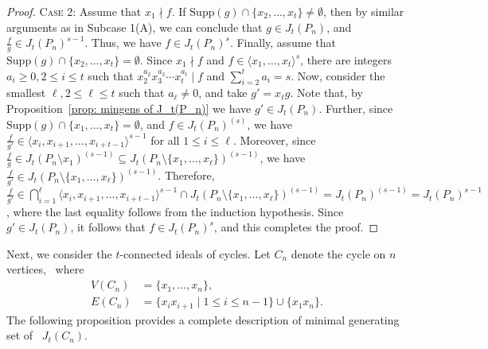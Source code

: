 \documentclass[12pt]{amsart}
\def\l{\langle}
\def\r{\rangle}
\begin{document}
\begin{proof}
	\medskip
	\noindent
	\textsc{Case 2}: Assume that $x_1\nmid f$. If $\mathrm{Supp}(g)\cap \{x_2,\ldots ,x_t\}\neq \emptyset$, then by similar arguments as in Subcase 1(A), we can conclude that $g\in J_t(P_n)$, and $\frac{f}{g}\in J_t(P_n)^{s-1}$. Thus, we have $f\in J_t(P_n)^{s}$. Finally, assume that $\mathrm{Supp}(g)\cap \{x_2,\dots ,x_t\}= \emptyset$. Since $x_1\nmid f$ and $f\in \l x_1,\dots ,x_t\r^s$, there are integers $a_i\geq 0, 2\leq i\leq t$ such that $x_2^{a_2}x_3^{a_3}\cdots x_{t}^{a_t}\mid f$ and $\sum_{i=2}^ta_i=s$. Now, consider the smallest $\ell, 2\leq \ell \leq t$ such that $a_{\ell}\neq 0$, and take $g'=x_{\ell}g$. Note that, by Proposition~\ref{prop: mingens of J_t(P_n)} we have $g'\in J_t(P_n)$. Further, since $\mathrm{Supp}(g)\cap \{x_1,\dots ,x_t\}= \emptyset$, and $f\in J_t(P_n)^{(s)}$, we have $\frac{f}{g'}\in \l x_i, x_{i+1},\dots , x_{i+t-1}\r^{s-1}$ for all $1\leq i\leq \ell$. Moreover, since $\frac{f}{g}\in J_t(P_n\setminus x_1)^{(s-1)}\subseteq J_t(P_n\setminus \{x_1,\dots , x_{\ell}\})^{(s-1)}$, we have $\frac{f}{g'}\in J_t(P_n\setminus \{x_1,\dots , x_{\ell}\})^{(s-1)}$. Therefore, $\frac{f}{g'}\in \bigcap_{i=1}^{\ell} \l x_i, x_{i+1},\dots , x_{i+t-1}\r^{s-1} \cap J_t(P_n\setminus \{x_1,\dots , x_{\ell}\})^{(s-1)}= J_t(P_n)^{(s-1)}= J_t(P_n)^{s-1}$, where the last equality follows from the induction hypothesis. Since $g'\in J_t(P_n)$, it follows that $f\in J_t(P_n)^s$, and this completes the proof.
\end{proof}


Next, we consider the $t$-connected ideals of cycles. Let $C_n$ denote the cycle on $n$ vertices,~ where 
\begin{align*}
    V(C_n)&=\{x_1,\dots , x_n\},\\
    E(C_n)&=\{x_ix_{i+1}\mid 1\leq i\leq n-1\}\cup \{x_1x_n\}.
\end{align*}
The following proposition provides a complete description of minimal generating set of~ $J_t(C_n)$.
\end{document}
